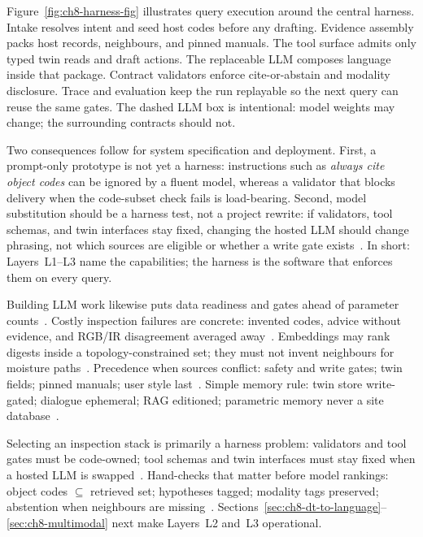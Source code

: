 Figure~\ref{fig:ch8-harness-fig} illustrates query execution around the central harness. Intake resolves intent and seed host codes before any drafting. Evidence assembly packs host records, neighbours, and pinned manuals. The tool surface admits only typed twin reads and draft actions. The replaceable LLM composes language inside that package. Contract validators enforce cite-or-abstain and modality disclosure. Trace and evaluation keep the run replayable so the next query can reuse the same gates. The dashed LLM box is intentional: model weights may change; the surrounding contracts should not.

Two consequences follow for system specification and deployment. First, a prompt-only prototype is not yet a harness: instructions such as \emph{always cite object codes} can be ignored by a fluent model, whereas a validator that blocks delivery when the code-subset check fails is load-bearing. Second, model substitution should be a harness test, not a project rewrite: if validators, tool schemas, and twin interfaces stay fixed, changing the hosted LLM should change phrasing, not which sources are eligible or whether a write gate exists~\cite{liang2023helm,saka2024gptconstruction}. In short: Layers~L1--L3 name the capabilities; the harness is the software that enforces them on every query.

Building LLM work likewise puts data readiness and gates ahead of parameter counts~\cite{ma2026tenquestions,pan2026graphdtgpt,gao2026ifcagent,luo2025llmdtrobot}. Costly inspection failures are concrete: invented codes, advice without evidence, and RGB/IR disagreement averaged away~\cite{ji2023}. Embeddings may rank digests inside a topology-constrained set; they must not invent neighbours for moisture paths~\cite{peng2024,jeon2025hybridrag}. Precedence when sources conflict: safety and write gates; twin fields; pinned manuals; user style last~\cite{saka2024gptconstruction}. Simple memory rule: twin store write-gated; dialogue ephemeral; RAG editioned; parametric memory never a site database~\cite{luo2025llmdtrobot,rawat2025llmmas}.

Selecting an inspection stack is primarily a harness problem: validators and tool gates must be code-owned; tool schemas and twin interfaces must stay fixed when a hosted LLM is swapped~\cite{saka2024gptconstruction,liang2023helm}. Hand-checks that matter before model rankings: object codes $\subseteq$ retrieved set; hypotheses tagged; modality tags preserved; abstention when neighbours are missing~\cite{ji2023,shuster2021,lewis2020}. Sections~\ref{sec:ch8-dt-to-language}--\ref{sec:ch8-multimodal} next make Layers~L2 and~L3 operational.



